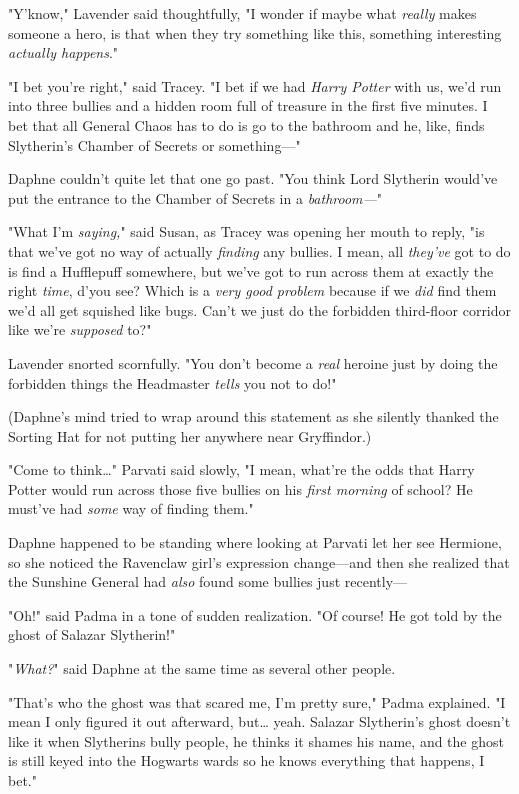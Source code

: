 "Y'know," Lavender said thoughtfully, "I wonder if maybe what \emph{really} 
makes someone a hero, is that when they try something like this, something 
interesting\emph{ actually happens}."

"I bet you're right," said Tracey. "I bet if we had \emph{Harry Potter} with 
us, we'd run into three bullies and a hidden room full of treasure in the first 
five minutes. I bet that all General Chaos has to do is go to the bathroom and 
he, like, finds Slytherin's Chamber of Secrets or something---"

Daphne couldn't quite let that one go past. "You think Lord Slytherin would've 
put the entrance to the Chamber of Secrets in a \emph{bathroom---}"

"What I'm \emph{saying,}" said Susan, as Tracey was opening her mouth to reply, 
"is that we've got no way of actually \emph{finding} any bullies. I mean, all 
\emph{they've} got to do is find a Hufflepuff somewhere, but we've got to run 
across them at exactly the right \emph{time}, d'you see? Which is a \emph{very 
good problem} because if we \emph{did} find them we'd all get squished like 
bugs. Can't we just do the forbidden third-floor corridor like we're 
\emph{supposed} to?"

Lavender snorted scornfully. "You don't become a \emph{real} heroine just by 
doing the forbidden things the Headmaster \emph{tells} you not to do!"

(Daphne's mind tried to wrap around this statement as she silently thanked the 
Sorting Hat for not putting her anywhere near Gryffindor.)

"Come to think{\ldots}" Parvati said slowly, "I mean, what're the odds that 
Harry Potter would run across those five bullies on his \emph{first morning} of 
school? He must've had \emph{some} way of finding them."

Daphne happened to be standing where looking at Parvati let her see Hermione, 
so she noticed the Ravenclaw girl's expression change---and then she realized 
that the Sunshine General had \emph{also} found some bullies just recently---

"Oh!" said Padma in a tone of sudden realization. "Of course! He got told by 
the ghost of Salazar Slytherin!"

"\emph{What?}" said Daphne at the same time as several other people.

"That's who the ghost was that scared me, I'm pretty sure," Padma explained. "I 
mean I only figured it out afterward, but{\ldots} yeah. Salazar Slytherin's 
ghost doesn't like it when Slytherins bully people, he thinks it shames his 
name, and the ghost is still keyed into the Hogwarts wards so he knows 
everything that happens, I bet."

